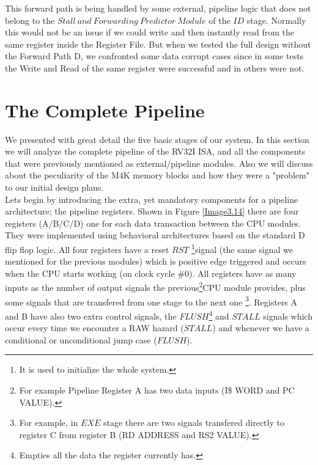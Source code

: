This forward path is being handled by some external, pipeline logic that does not belong to the $Stall \ and \ Forwarding \ Predictor \ Module$ of the $ID$ stage. Normally this would not be an issue if we could write and then instantly read from the same register inside the Register File. But when we tested the full design without the Forward Path D, we confronted some data corrupt cases since in some tests the Write and Read of the same register were successful and in others were not.

\section{The Complete Pipeline}
\label{Sec3.6:COMPLETE}

We presented with great detail the five basic stages of our system. In this section we will analyze the complete pipeline of the RV32I ISA, and all the components that were previously mentioned as external/pipeline modules. Also we will discuss about the peculiarity of the M4K memory blocks and how they were a "problem" to our initial design plans. \\

Lets begin by introducing the extra, yet mandatory components for a pipeline architecture; the pipeline registers. Shown in Figure \ref{Image3.14} there are four registers (A/B/C/D) one for each data transaction between the CPU modules. They were implemented using behavioral architectures based on the standard D flip flop logic. All four registers have a reset $RST$ \footnote{It is used to initialize the whole system.}signal (the same signal we mentioned for the previous modules) which is positive edge triggered and occurs when the CPU starts working (on clock cycle \#0). All registers have as many inputs as the number of output signals the previous\footnote{For example Pipeline Register A has two data inputs (I\$ WORD and PC VALUE).}CPU module provides, plus some signals that are transfered from one stage to the next one \footnote{For example, in $EXE$ stage there are two signals transfered directly to register C from register B (RD ADDRESS and RS2 VALUE).}. Registers A and B have also two extra control signals, the $FLUSH$\footnote{ Empties all the data the register currently has. }  and $STALL$ signals which occur every time we encounter a RAW hazard ($STALL$) and whenever we have a conditional or unconditional jump case ($FLUSH$). \\

